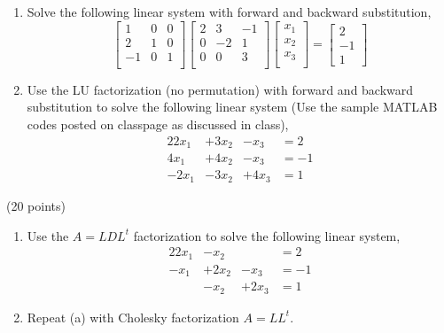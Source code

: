 \documentclass[10pt]{jhwhw}
\begin{document}
	\begin{enumerate}
		\item Solve the following linear system with forward and backward substitution,
			$$
			\begin{bmatrix}
				1 & 0 & 0 \\
				2 & 1 & 0 \\
				-1 & 0 & 1 \\
			\end{bmatrix}
			\begin{bmatrix}
				2 & 3 & -1 \\
				0 & -2 & 1 \\
				0 & 0 & 3 \\
			\end{bmatrix}
			\begin{bmatrix}
				x_1 \\ x_2 \\ x_3 \\
			\end{bmatrix} = 
			\begin{bmatrix}
				2 \\ -1 \\ 1
			\end{bmatrix}
			$$
		\item Use the LU factorization (no permutation) with forward and backward
			substitution to solve the following linear system (Use the sample MATLAB
			codes posted on classpage as discussed in class),
			\begin{alignat*}{2}
				2x_1 &+ 3x_2 &- x_3 &= 2 \\
				4x_1 &+ 4x_2 &- x_3 &= -1 \\
				-2x_1 &- 3x_2 &+ 4x_3 &= 1
			\end{alignat*}
	\end{enumerate}

\solution

\problem{} (20 points)

	\begin{enumerate}
		\item Use the $A = LDL^t$ factorization to solve the following linear system,
			\begin{alignat*}{2}
				2x_1 &- x_2 & &= 2 \\
				-x_1 &+ 2x_2 &- x_3 &= -1 \\
				&- x_2 &+ 2x_3 &= 1
			\end{alignat*}
		\item Repeat (a) with Cholesky factorization $A = LL^t$.
	\end{enumerate}

\solution
\end{document}
